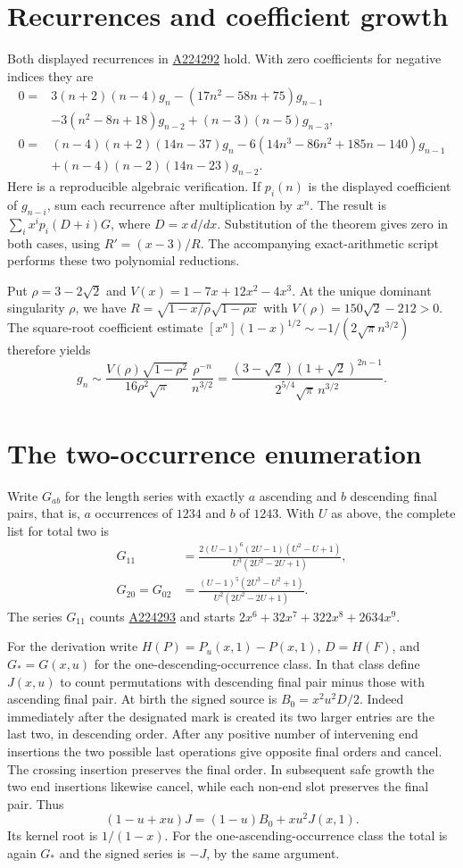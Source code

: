 \documentclass[11pt,letterpaper]{article}
\newcommand{\oeis}[1]{\href{https://oeis.org/A#1}{A#1}}
\begin{document}
\section{Recurrences and coefficient growth}
Both displayed recurrences in \oeis{224292} hold. With zero coefficients for negative indices they are
\begin{align*}
0={}&3(n+2)(n-4)g_n-(17n^2-58n+75)g_{n-1}\\
 &-3(n^2-8n+18)g_{n-2}+(n-3)(n-5)g_{n-3},\\
0={}&(n-4)(n+2)(14n-37)g_n-6(14n^3-86n^2+185n-140)g_{n-1}\\
 &+(n-4)(n-2)(14n-23)g_{n-2}.
\end{align*}
Here is a reproducible algebraic verification. If \(p_i(n)\) is the displayed coefficient of \(g_{n-i}\), sum each recurrence after multiplication by \(x^n\). The result is \(\sum_i x^i p_i(D+i)G\), where \(D=x\,d/dx\). Substitution of the theorem gives zero in both cases, using \(R'=(x-3)/R\). The accompanying exact-arithmetic script performs these two polynomial reductions.

Put \(\rho=3-2\sqrt2\) and \(V(x)=1-7x+12x^2-4x^3\). At the unique dominant singularity \(\rho\), we have \(R=\sqrt{1-x/\rho}\sqrt{1-\rho x}\) with \(V(\rho)=150\sqrt2-212>0\). The square-root coefficient estimate \([x^n](1-x)^{1/2}\sim-1/(2\sqrt\pi n^{3/2})\) therefore yields
\[
 g_n\sim
 \frac{V(\rho)\sqrt{1-\rho^2}}{16\rho^2\sqrt{\pi}}\,
     \frac{\rho^{-n}}{n^{3/2}}
 =\frac{(3-\sqrt2)(1+\sqrt2)^{2n-1}}{2^{5/4}\sqrt{\pi}\,n^{3/2}} .
\]

\section{The two-occurrence enumeration}
Write \(G_{ab}\) for the length series with exactly \(a\) ascending and \(b\) descending final pairs, that is, \(a\) occurrences of \(1234\) and \(b\) of \(1243\). With \(U\) as above, the complete list for total two is
\begin{align*}
G_{11}&=\frac{2(U-1)^6(2U-1)(U^2-U+1)}{U^3(2U^2-2U+1)},\\
G_{20}=G_{02}&=\frac{(U-1)^5(2U^3-U^2+1)}{U^2(2U^2-2U+1)}.
\end{align*}
The series \(G_{11}\) counts \oeis{224293} and starts \(2x^6+32x^7+322x^8+2634x^9\).

For the derivation write \(H(P)=P_u(x,1)-P(x,1)\), \(D=H(F)\), and \(G_*=G(x,u)\) for the one-descending-occurrence class. In that class define \(J(x,u)\) to count permutations with descending final pair minus those with ascending final pair. At birth the signed source is \(B_0=x^2u^2D/2\). Indeed immediately after the designated mark is created its two larger entries are the last two, in descending order. After any positive number of intervening end insertions the two possible last operations give opposite final orders and cancel. The crossing insertion preserves the final order. In subsequent safe growth the two end insertions likewise cancel, while each non-end slot preserves the final pair. Thus
\[
 (1-u+xu)J=(1-u)B_0+xu^2J(x,1).
\]
Its kernel root is \(1/(1-x)\). For the one-ascending-occurrence class the total is again \(G_*\) and the signed series is \(-J\), by the same argument.
\end{document}
